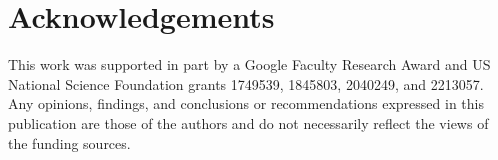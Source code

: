 \documentclass[11pt]{article}
\begin{document}
\section*{Acknowledgements}

This work was supported in part by a Google Faculty Research Award and US National Science Foundation grants 1749539, 1845803, 2040249, and 2213057.
Any opinions, findings, and conclusions or recommendations expressed in this publication are those of the authors and do not necessarily reflect the views of the funding sources.



\appendix

\end{document}
